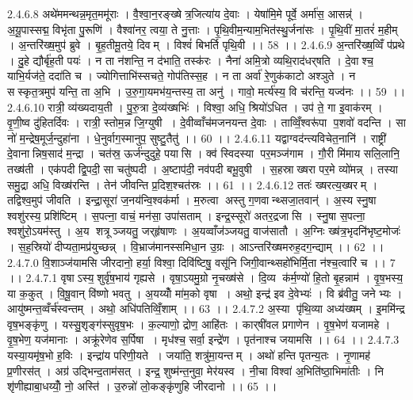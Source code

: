 2.4.6.8
अथे॑ममन्थन्न॒मृत॒ममू॑राः । वै॒श्वा॒न॒रङ्ख्षेत्र॒जित्या॑य दे॒वाः । येषा॑मि॒मे पूर्वे॒ अर्मा॑स॒ आसन्न्॑ । अ॒यू॒पास्सद्म॒ विभृ॑ता पु॒रूणि॑ । वैश्वा॑नर॒ त्वया॒ ते नु॒त्ताः । पृ॒थि॒वीम॒न्याम॒भित॑स्थु॒र्जना॑सः । पृ॒थि॒वीं मा॒तरं॑ म॒हीम् । अ॒न्तरि॑ख्ष॒मुप॑ ब्रुवे । बृ॒ह॒तीमू॒तये॒ दिवम् । विश्वं॑ बिभर्ति पृथि॒वी ।। 58 ।।
2.4.6.9
अ॒न्तरि॑ख्ष॒व्विँ प॑प्रथे । दु॒हे द्यौर्बृ॑ह॒ती पयः॑ । न ता न॑शन्ति॒ न द॑भाति॒ तस्क॑रः । नैना॑ अमि॒त्रो व्यथि॒राद॑धर्‌षति । दे॒वाश्च॒ याभि॒र्यज॑ते॒ ददा॑ति च । ज्योगित्ताभि॑स्सचते॒ गोप॑तिस्स॒ह । न ता अर्वा॑ रे॒णुक॑काटो अश्ञुते । न स॑स्कृत॒त्रमुप॑ यन्ति॒ ता अ॒भि । उ॒रु॒गा॒यमभ॑य॒न्तस्य॒ ता अनु॑ । गावो॒ मर्त्य॑स्य॒ वि च॑रन्ति॒ यज्व॑नः ।। 59 ।।
2.4.6.10
रात्री॒ व्य॑ख्यदाय॒ती । पु॒रु॒त्रा दे॒व्य॑ख्षभिः॑ । विश्वा॒ अधि॒ श्रियो॑ऽधित । उप॑ ते॒ गा इ॒वाक॑रम् । वृ॒णी॒ष्व दु॑हितर्दिवः । रात्री॒ स्तोम॒न्न जि॒ग्युषी । दे॒वीव्वाँच॑मजनयन्त दे॒वाः । ताव्विँ॒श्वरू॑पा प॒शवो॑ वदन्ति । सा नो॑ म॒न्द्रेष॒मूर्ज॒न्दुहा॑ना । धे॒नुर्वाग॒स्मानुप॒ सुष्टु॒तैतु॑ ।। 60 ।।
2.4.6.11
यद्वाग्वद॑न्त्यविचेत॒नानि॑ । राष्ट्री॑ दे॒वानान्निष॒साद॑ म॒न्द्रा । चत॑स्र॒ ऊर्ज॑न्दुदुहे॒ पया॑सि । क्व॑ स्विदस्या पर॒मञ्ज॑गाम । गौ॒री मि॑माय सलि॒लानि॒ तख्ष॑ती । एक॑पदी द्वि॒पदी॒ सा चतु॑ष्पदी । अ॒ष्टाप॑दी॒ नव॑पदी बभू॒वुषी । स॒हस्राख्षरा पर॒मे व्यो॑मन्न् । तस्या॑ समु॒द्रा अधि॒ विख्ष॑रन्ति । तेन॑ जीवन्ति प्र॒दिश॒श्चत॑स्रः ।। 61 ।।
2.4.6.12
ततः॑ ख्षरत्य॒ख्षरम् । तद्विश्व॒मुप॑ जीवति । इन्द्रा॒सूरा॑ ज॒नय॑न्वि॒श्वक॑र्मा । म॒रुत्वा॑ अस्तु ग॒णवान्थ्सजा॒तवान्॑ । अ॒स्य स्नु॒षा श्वशु॑रस्य॒ प्रशि॑ष्टिम् । स॒पत्ना॒ वाचं॒ मन॑सा॒ उपा॑सताम् । इन्द्र॒स्सूरो॑ अतर॒द्रजा॑सि । स्नु॒षा स॒पत्ना॒ श्वशु॑रो॒ऽयम॑स्तु । अ॒य शत्रूञ्जयतु॒ जर्‌हृ॑षाणः । अ॒यव्वाँज॑ञ्जयतु॒ वाज॑सातौ । अ॒ग्निः ख्ष॑त्र॒भृदनि॑भृष्ट॒मोजः॑ । स॒ह॒स्रियो॑ दीप्यता॒मप्र॑युच्छन्न् । वि॒भ्राज॑मानस्समिधा॒न उ॒ग्रः । आऽन्तरि॑ख्षमरुह॒दग॒न्द्याम् ।। 62 ।।
2.4.7.0
वि॒शाञ्ज॑यामसि जीरदानो॒ हर्या॒ विश्वा॒ दिवि॑ष्टिषु॒ वसू॑नि जिगी॒वान्थ्सहो॑भिर्मि॒ता न॑श्च॒त्वारि॑ च ।। 7 ।।
2.4.7.1
वृषाऽस्य॒॒शुर्वृ॑ष॒भाय॑ गृह्यसे । वृषा॒ऽयमु॒ग्रो नृ॒चख्ष॑से । दि॒व्य क॑र्म॒ण्यो॑ हि॒तो बृ॒हन्नाम॑ । वृ॒ष॒भस्य॒ या क॒कुत् । वि॒षू॒वान् वि॑ष्णो भवतु । अ॒यय्योँ मा॑म॒को वृषा । अथो॒ इन्द्र॑ इव दे॒वेभ्यः॑ । वि ब्र॑वीतु॒ जनेभ्यः । आयु॑ष्मन्त॒व्वँर्च॑स्वन्तम् । अथो॒ अधि॑पतिव्विँ॒शाम् ।। 63 ।।
2.4.7.2
अ॒स्या पृ॑थि॒व्या अध्य॑ख्षम् । इ॒ममि॑न्द्र वृष॒भङ्कृ॑णु । यस्सु॒शृङ्ग॑स्सुवृष॒भः । क॒ल्याणो॒ द्रोण॒ आहि॑तः । कार्‌षी॑वल प्रगाणेन । वृ॒ष॒भेण॑ यजामहे । वृ॒ष॒भेण॒ यज॑मानाः । अक्रू॑रेणेव स॒र्पिषा । मृध॑श्च॒ सर्वा॒ इन्द्रे॑ण । पृत॑नाश्च जयामसि ।। 64 ।।
2.4.7.3
यस्या॒यमृ॑ष॒भो ह॒विः । इन्द्रा॑य परिणी॒यते । जया॑ति॒ शत्रु॑मा॒यन्तम् । अथो॑ हन्ति पृतन्य॒तः । नृ॒णामह॑ प्र॒णीरस॑त् । अग्र॑ उद्भिन्द॒ताम॑सत् । इन्द्र॒ शुष्म॑न्त॒नुवा॒ मेर॑यस्व । नी॒चा विश्वा॑ अ॒भिति॑ष्ठा॒भिमा॑तीः । नि शृ॑णीह्याबा॒धय्योँ॒ नो॒ अस्ति॑ । उ॒रुन्नो॑ लो॒कङ्कृ॑णुहि जीरदानो ।। 65 ।।
